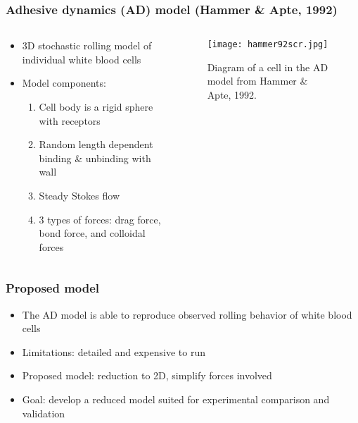 \documentclass{beamer}
\begin{document}
\begin{frame}
  \frametitle{Adhesive dynamics (AD) model (Hammer \& Apte, 1992)}
  \begin{columns}
    \begin{column}{.49\textwidth}
      \begin{itemize}
      \item 3D stochastic rolling model of individual white blood cells
      \item Model components:
        \begin{enumerate}
        \item Cell body is a rigid sphere with receptors
        \item Random length dependent binding \& unbinding with wall
        \item Steady Stokes flow
        \item 3 types of forces: drag force, bond force, and colloidal
          forces
        \end{enumerate}
      \end{itemize}
    \end{column}
    \begin{column}{.49\textwidth}
      \begin{figure}
        \centering
        \texttt{[image: hammer92scr.jpg]}
        \caption{Diagram of a cell in the AD model from Hammer \&
          Apte, 1992.}
        \label{fig:hammer-scr}
      \end{figure}
    \end{column}
  \end{columns}
\end{frame}

\begin{frame}
  \frametitle{Proposed model}
  \begin{itemize}
  \item The AD model is able to reproduce observed rolling behavior of
    white blood cells
    \vfill
  \item Limitations: detailed and expensive to run
    \vfill
  \item Proposed model: reduction to 2D, simplify forces involved
    \vfill
  \item Goal: develop a reduced model suited for experimental
    comparison and validation
  \end{itemize}
\end{frame}
\end{document}
